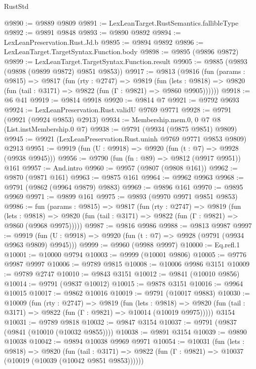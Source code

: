 \begin{lexlean}{RustStd}
\begin{coremodule}
@9890 := @9889 @9809
@9891 := LexLeanTarget.RustSemantics.fallibleType
@9892 := @9891 @9848
@9893 := @9890 @9892
@9894 := LexLeanPreservation.Rust.Jd.b
@9895 := @9894 @9892
@9896 := LexLeanTarget.TargetSyntax.Function.body
@9898 := @9895 (@9896 @9872)
@9899 := LexLeanTarget.TargetSyntax.Function.result
@9905 := @9885 (@9893 (@9898 (@9899 @9872) @9851 @9853))
@9917 := @9813
    (@9816
      (fun (params : @9815) =>
      @9817
        (fun (rty : @2747) =>
        @9819
          (fun (lets : @9818) =>
          @9820 (fun (tail : @3171) => @9822 (fun (Γ : @9821) => @9860 @9905))))))
@9918 := @6 @41
@9919 := @9814 @9918
@9920 := @9814 @7
@9921 := @9792 @9693
@9924 := LexLeanPreservation.Rust.validU @9769 @9771
@9928 := @9791 (@9921 (@9924 @9853) @2913)
@9934 := Membership.mem.{0, 0} @7 @8 (List.instMembership.{0} @7)
@9938 := @9791 (@9934 (@9875 @9851) @9809)
@9945 := @9921 (LexLeanPreservation.Rust.uninh @9769 @9771 @9853 @9809) @2913
@9951 := @9919 (fun (U : @9918) => @9920 (fun (t : @7) => @9928 (@9938 @9945)))
@9956 := @9790 (fun (fn : @89) => @9812 (@9917 @9951)) @161
@9957 := And.intro
@9960 := @9957 (@9807 (@9808 @161))
@9962 := @9870 (@9871 @161)
@9963 := @9875 @161
@9964 := @9962 @9963
@9968 := @9791 (@9862 (@9964 @9879) @9883)
@9969 := @9896 @161
@9970 := @9895 @9969
@9971 := @9899 @161
@9975 := @9893 (@9970 @9971 @9851 @9853)
@9986 := fun (params : @9815) =>
  @9817
    (fun (rty : @2747) =>
    @9819
      (fun (lets : @9818) =>
      @9820 (fun (tail : @3171) => @9822 (fun (Γ : @9821) => @9860 (@9968 @9975)))))
@9987 := @9816 @9986
@9988 := @9813 @9987
@9997 := @9919 (fun (U : @9918) => @9920 (fun (t : @7) => @9928 (@9791 (@9934 @9963 @9809) @9945)))
@9999 := @9960 (@9988 @9997)
@10000 := Eq.refl.{1}
@10001 := @10000 @9794
@10003 := @9999 (@10001 @9806)
@10005 := @9776 @9987 @9997
@10006 := @9789 @9815
@10008 := @10006 @9986 @3151
@10009 := @9789 @2747
@10010 := @9843 @3151
@10012 := @9841 (@10010 @9856)
@10014 := @9791 (@9837 @10012)
@10015 := @9878 @3151
@10016 := @9964 @10015
@10017 := @9862 @10016
@10019 := @9791 (@10017 @9883)
@10030 := @10009
    (fun (rty : @2747) =>
    @9819
      (fun (lets : @9818) =>
      @9820 (fun (tail : @3171) => @9822 (fun (Γ : @9821) => @10014 (@10019 @9975)))))
    @3154
@10031 := @9789 @9818
@10032 := @9847 @3154
@10037 := @9791 (@9837 (@9841 (@10010 (@10032 @9855))))
@10038 := @9891 @3154
@10039 := @9890 @10038
@10042 := @9894 @10038 @9969 @9971
@10054 := @10031
    (fun (lets : @9818) =>
    @9820
      (fun (tail : @3171) =>
      @9822 (fun (Γ : @9821) => @10037 (@10019 (@10039 (@10042 @9851 @9853))))))

\end{coremodule}
\end{lexlean}
